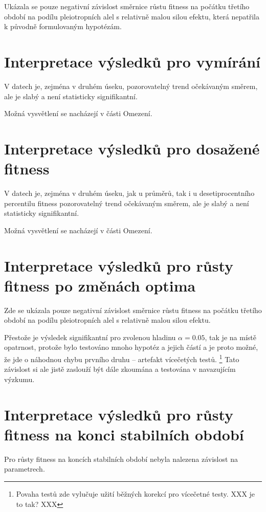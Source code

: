 Ukázala se pouze negativní závislost směrnice růstu fitness na počátku třetího období na podílu pleiotropních alel s
relativně malou silou efektu, která nepatřila k původně formulovaným hypotézám.

\section{Interpretace výsledků pro vymírání}

V datech je, zejména v druhém úseku, pozorovatelný trend očekávaným směrem, ale je slabý a není statisticky
signifikantní.

Možná vysvětlení se nacházejí v části Omezení.

\section{Interpretace výsledků pro dosažené fitness}

V datech je, zejména v druhém úseku, jak u průměrů, tak i u desetiprocentního percentilu fitness pozorovatelný trend
očekávaným směrem, ale je slabý a není statisticky signifikantní.

Možná vysvětlení se nacházejí v části Omezení.

\section{Interpretace výsledků pro růsty fitness po změnách optima}

Zde se ukázala pouze negativní závislost směrnice růstu fitness na počátku třetího období na podílu pleiotropních alel
s relativně malou silou efektu.

Přestože je výsledek signifikantní pro zvolenou hladinu $\alpha = 0.05$, tak je na místě
opatrnost, protože bylo testováno mnoho hypotéz a jejich částí a je proto možné, že jde o náhodnou chybu prvního
druhu -- artefakt vícečetých testů. \footnote{Povaha testů zde vylučuje užití běžných korekcí pro vícečetné
testy. XXX je to tak? XXX}
Tato závislost si ale jistě zaslouží být dále zkoumána a testována v navazujícím výzkumu.

\section{Interpretace výsledků pro růsty fitness na konci stabilních období}

Pro růsty fitness na koncích stabilních období nebyla nalezena závislost na parametrech.

